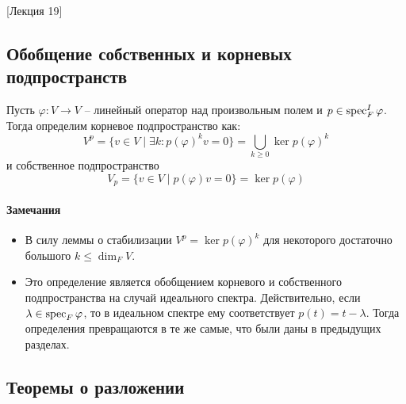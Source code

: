[Лекция 19]


\subsection{Обобщение собственных и корневых подпространств}

\begin{definition}
Пусть $\varphi\colon V\to V$ -- линейный оператор над произвольным полем и $p\in \operatorname{spec}_F^I \varphi$.
Тогда определим корневое подпространство как:
\[
V^p = \{v\in V\mid \exists k\colon p(\varphi)^k v = 0\} = \bigcup_{k\geqslant 0}\ker p(\varphi)^k
\]
и собственное подпространство
\[
V_p =\{v\in V \mid p(\varphi)v = 0\} = \ker p(\varphi)
\]
\end{definition}

\paragraph{Замечания}

\begin{itemize}
\item В силу леммы о стабилизации $V^p = \ker p(\varphi)^k$ для некоторого достаточно большого $k\leqslant \dim_F V$.

\item Это определение является обобщением корневого и собственного подпространства на случай идеального спектра.
Действительно, если $\lambda\in\operatorname{spec}_F \varphi$, то в идеальном спектре ему соответствует $p(t) = t - \lambda$.
Тогда определения превращаются в те же самые, что были даны в предыдущих разделах.
\end{itemize}

\subsection{Теоремы о разложении}


